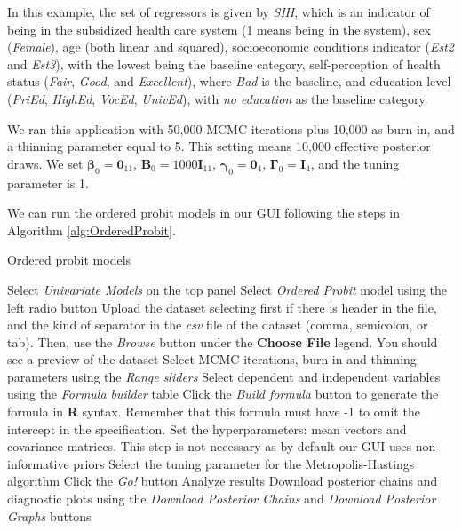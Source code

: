 In this example, the set of regressors is given by \textit{SHI}, which is an indicator of being in the subsidized health care system (1 means being in the system), sex (\textit{Female}), age (both linear and squared), socioeconomic conditions indicator (\textit{Est2} and \textit{Est3}), with the lowest being the baseline category, self-perception of health status (\textit{Fair}, \textit{Good}, and \textit{Excellent}), where \textit{Bad} is the baseline, and education level (\textit{PriEd}, \textit{HighEd}, \textit{VocEd}, \textit{UnivEd}), with \textit{no education} as the baseline category.

We ran this application with 50,000 MCMC iterations plus 10,000 as burn-in, and a thinning parameter equal to 5. This setting means 10,000 effective posterior draws. We set $\bm{\beta}_0 = \bm{0}_{11}$, $\bm{B}_0 = 1000\bm{I}_{11}$, $\bm{\gamma}_0 = \bm{0}_4$, $\bm{\Gamma}_0 = \bm{I}_4$, and the tuning parameter is 1.

We can run the ordered probit models in our GUI following the steps in Algorithm \ref{alg:OrderedProbit}.
 
\begin{algorithm}[h!]
	\caption{Ordered probit models}\label{alg:OrderedProbit}
	\begin{algorithmic}[1]  		 			
		\State Select \textit{Univariate Models} on the top panel
		\State Select \textit{Ordered Probit} model using the left radio button
		\State Upload the dataset selecting first if there is header in the file, and the kind of separator in the \textit{csv} file of the dataset (comma, semicolon, or tab). Then, use the \textit{Browse} button under the \textbf{Choose File} legend. You should see a preview of the dataset
		\State Select MCMC iterations, burn-in and thinning parameters using the \textit{Range sliders}
		\State Select dependent and independent variables using the \textit{Formula builder} table
		\State Click the \textit{Build formula} button to generate the formula in \textbf{R} syntax. Remember that this formula must have -1 to omit the intercept in the specification.
		\State Set the hyperparameters: mean vectors and covariance matrices. This step is not necessary as by default our GUI uses non-informative priors
		\State Select the tuning parameter for the Metropolis-Hastings algorithm 
		\State Click the \textit{Go!} button
		\State Analyze results
		\State Download posterior chains and diagnostic plots using the \textit{Download Posterior Chains} and \textit{Download Posterior Graphs} buttons
	\end{algorithmic} 
\end{algorithm}

